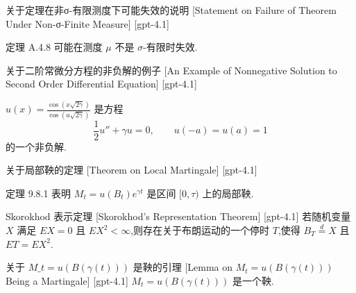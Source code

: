 \documentclass[UTF8]{ctexart}
\begin{document}
    
    
    \begin{thm}
        {关于定理在非σ-有限测度下可能失效的说明}
        [Statement on Failure of Theorem Under Non-σ-Finite Measure]
        [gpt-4.1]
        
定理 A.4.8 可能在测度 $\mu$ 不是 $\sigma$-有限时失效.

    \end{thm}
    
    
    
    \begin{xmp}
        {关于二阶常微分方程的非负解的例子}
        [An Example of Nonnegative Solution to Second Order Differential Equation]
        [gpt-4.1]
        
$u(x) = \frac{\cos(x\sqrt{2\gamma})}{\cos(a\sqrt{2\gamma})}$ 是方程
\[
\frac{1}{2} u'' + \gamma u = 0,\qquad u(-a) = u(a) = 1
\]
的一个非负解.

    \end{xmp}
    
    
    
    \begin{thm}
        {关于局部鞅的定理}
        [Theorem on Local Martingale]
        [gpt-4.1]
        
定理 9.8.1 表明 $M_t = u(B_t) e^{\gamma t}$ 是区间 $[0, \tau)$ 上的局部鞅.

    \end{thm}
    
    
    
    \begin{thm}
        {Skorokhod 表示定理}
        [Skorokhod's Representation Theorem]
        [gpt-4.1]
        若随机变量 $X$ 满足 $E X = 0$ 且 $E X^2 < \infty$,则存在关于布朗运动的一个停时 $T$,使得 $B_T \overset{d}{=} X$ 且 $E T = E X^2$.
    \end{thm}
    
    
    
    \begin{lma}
        [Lemma-on-$M-t-=-uB\gammat$-Being-a-Martingale]
        {关于 $M\_t = u(B(\gamma(t)))$ 是鞅的引理}
        [Lemma on $M_t = u(B(\gamma(t)))$ Being a Martingale]
        [gpt-4.1]
        $M_{t} = u(B(\gamma(t)))$ 是一个鞅.
    \end{lma}
    
\end{document}
